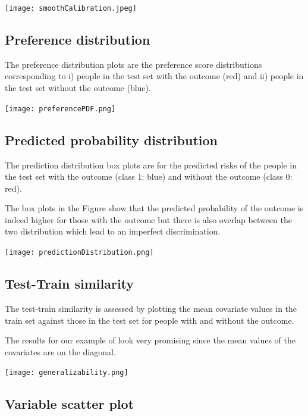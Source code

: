 \documentclass[]{article}
\begin{document}
\texttt{[image: smoothCalibration.jpeg]}

\newpage

\subsection{Preference distribution}\label{preference-distribution}

The preference distribution plots are the preference score distributions
corresponding to i) people in the test set with the outcome (red) and
ii) people in the test set without the outcome (blue).

\texttt{[image: preferencePDF.png]}

\newpage

\subsection{Predicted probability
distribution}\label{predicted-probability-distribution}

The prediction distribution box plots are for the predicted risks of the
people in the test set with the outcome (class 1: blue) and without the
outcome (class 0: red).

The box plots in the Figure show that the predicted probability of the
outcome is indeed higher for those with the outcome but there is also
overlap between the two distribution which lead to an imperfect
discrimination.

\texttt{[image: predictionDistribution.png]}

\newpage

\subsection{Test-Train similarity}\label{test-train-similarity}

The test-train similarity is assessed by plotting the mean covariate
values in the train set against those in the test set for people with
and without the outcome.

The results for our example of look very promising since the mean values
of the covariates are on the diagonal.

\texttt{[image: generalizability.png]}

\newpage

\subsection{Variable scatter plot}\label{variable-scatter-plot}
\end{document}
